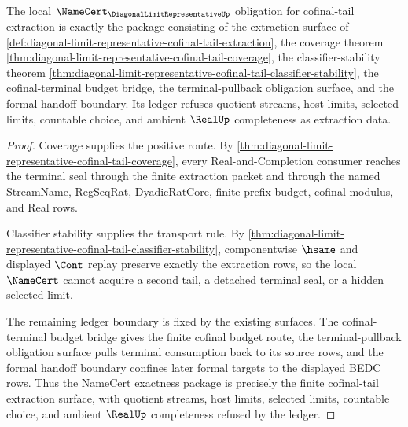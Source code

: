 \begin{theorem}
\label{thm:diagonal-limit-representative-cofinal-tail-namecert-exactness}
The local $\NameCert_{\DiagonalLimitRepresentativeUp}$ obligation for cofinal-tail extraction is exactly the package consisting of the extraction surface of \autoref{def:diagonal-limit-representative-cofinal-tail-extraction}, the coverage theorem \autoref{thm:diagonal-limit-representative-cofinal-tail-coverage}, the classifier-stability theorem \autoref{thm:diagonal-limit-representative-cofinal-tail-classifier-stability}, the cofinal-terminal budget bridge, the terminal-pullback obligation surface, and the formal handoff boundary. Its ledger refuses quotient streams, host limits, selected limits, countable choice, and ambient $\RealUp$ completeness as extraction data.
\end{theorem}
\begin{proof}
Coverage supplies the positive route. By \autoref{thm:diagonal-limit-representative-cofinal-tail-coverage}, every Real-and-Completion consumer reaches the terminal seal through the finite extraction packet and through the named StreamName, RegSeqRat, DyadicRatCore, finite-prefix budget, cofinal modulus, and Real rows.

Classifier stability supplies the transport rule. By \autoref{thm:diagonal-limit-representative-cofinal-tail-classifier-stability}, componentwise $\hsame$ and displayed $\Cont$ replay preserve exactly the extraction rows, so the local $\NameCert$ cannot acquire a second tail, a detached terminal seal, or a hidden selected limit.

The remaining ledger boundary is fixed by the existing surfaces. The cofinal-terminal budget bridge gives the finite cofinal budget route, the terminal-pullback obligation surface pulls terminal consumption back to its source rows, and the formal handoff boundary confines later formal targets to the displayed BEDC rows. Thus the NameCert exactness package is precisely the finite cofinal-tail extraction surface, with quotient streams, host limits, selected limits, countable choice, and ambient $\RealUp$ completeness refused by the ledger.
\end{proof}
